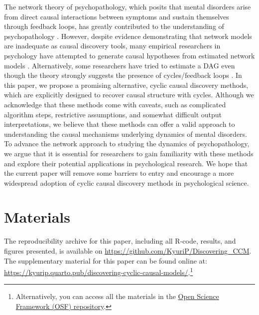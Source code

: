 \documentclass[twoside, 11pt]{article}
\begin{document}
The network theory of psychopathology, which posits that mental disorders arise from direct causal interactions between symptoms and sustain themselves through feedback loops, has greatly contributed to the understanding of psychopathology \citep{borsboom_network_2017}. However, despite evidence demonstrating that network models are inadequate as causal discovery tools, many empirical researchers in psychology have attempted to generate causal hypotheses from estimated network models \citep{Ryan2022}. Alternatively, some researchers have tried to estimate a DAG even though the theory strongly suggests the presence of cycles/feedback loops \citep{mcnally_co-morbid_2017, briganti_tutorial_2022}. In this paper, we propose a promising alternative, cyclic causal discovery methods, which are explicitly designed to recover causal structure with cycles. Although we acknowledge that these methods come with caveats, such as complicated algorithm steps, restrictive assumptions, and somewhat difficult output interpretations, we believe that these methods can offer a valid approach to understanding the causal mechanisms underlying dynamics of mental disorders. To advance the network approach to studying the dynamics of psychopathology, we argue that it is essential for researchers to gain familiarity with these methods and explore their potential applications in psychological research. We hope that the current paper will remove some barriers to entry and encourage a more widespread adoption of cyclic causal discovery methods in psychological science.


\section*{Materials}  %
The reproducibility archive for this paper, including all R-code, results, and figures presented, is available on \url{https://github.com/KyuriP/Discovering_CCM}. The supplementary material for this paper can be found online at: \url{https://kyurip.quarto.pub/discovering-cyclic-causal-models/}.\footnote{Alternatively, you can access all the materials in the \href{https://osf.io/tjbq2/}{Open Science Framework (OSF) repository}.}
\end{document}
